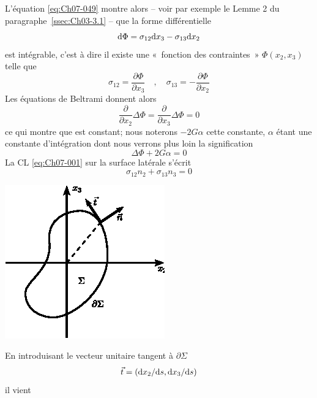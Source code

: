 L'équation \eqref{eq:Ch07-049} montre alors -- voir par exemple le Lemme 2 du paragraphe~\ref{ssec:Ch03-3.1} -- que la forme différentielle
\begin{equation}
    \mathrm{d} \Phi = \sigma_{12} \mathrm{d} x_3 - \sigma_{13} \mathrm{d} x_2
    \label{eq:Ch07-051}
\end{equation}
est intégrable, c'est à dire il existe une «~fonction des contraintes~» $\Phi\left( x_2, x_3 \right)$ telle que
\begin{equation}
    \sigma_{12} = \frac{\partial \Phi}{\partial x_3} \quad , \quad \sigma_{13} = - \frac{\partial \Phi}{\partial x_2}
    \label{eq:Ch07-052}
\end{equation}
Les équations de Beltrami donnent alors
\begin{equation}
    \frac{\partial}{\partial x_2} \Delta \Phi = \frac{\partial}{\partial x_3} \Delta \Phi = 0
    \label{eq:Ch07-053}
\end{equation}
ce qui montre que est constant; nous noterons $-2G\alpha$ cette constante, $\alpha$ étant une constante d'intégration dont nous verrons plus loin la signification
\begin{equation}
    \Delta \Phi + 2 G \alpha = 0
    \label{eq:Ch07-054}
\end{equation}
La CL \eqref{eq:Ch07-001} sur la surface latérale s'écrit
\begin{equation}
    \sigma_{12} n_2 + \sigma_{13} n_3 = 0
    \label{eq:Ch07-055}
\end{equation}
\begin{multicols}{2}
    \begin{center}
        \includegraphics{../images/T1_Ch07-14}
    \end{center}
    \columnbreak
    En introduisant le vecteur unitaire tangent à $\partial \Sigma$
    \begin{displaymath}
        \vec{t} = \left( \mathrm{d} x_2 / \mathrm{d} s, \mathrm{d} x_3/\mathrm{d} s \right)
    \end{displaymath}
    il vient
\end{multicols}

